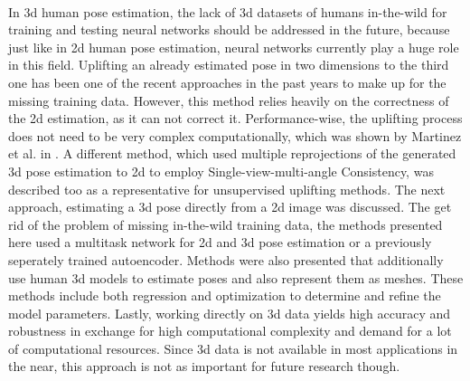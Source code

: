 \\ In 3d human pose estimation, the lack of 3d datasets of humans in-the-wild for training and testing neural networks should be addressed in the future, because just like in 2d human pose estimation, neural networks currently play a huge role in this field. Uplifting an already estimated pose in two dimensions to the third one has been one of the recent approaches in the past years to make up for the missing training data. However, this method relies heavily on the correctness of the 2d estimation, as it can not correct it. Performance-wise, the uplifting process does not need to be very complex computationally, which was shown by Martinez et al. in \cite{Martinez_2017_ICCV}. A different method, which used multiple reprojections of the generated 3d pose estimation to 2d to employ Single-view-multi-angle Consistency, was described too as a representative for unsupervised uplifting methods. The next approach, estimating a 3d pose directly from a 2d image was discussed. The get rid of the problem of missing in-the-wild training data, the methods presented here used a multitask network for 2d and 3d pose estimation or a previously seperately trained autoencoder. Methods were also presented that additionally use human 3d models to estimate poses and also represent them as meshes. These methods include both regression and optimization to determine and refine the model parameters. Lastly, working directly on 3d data yields high accuracy and robustness in exchange for high computational complexity and demand for a lot of computational resources. Since 3d data is not available in most applications in the near, this approach is not as important for future research though. 